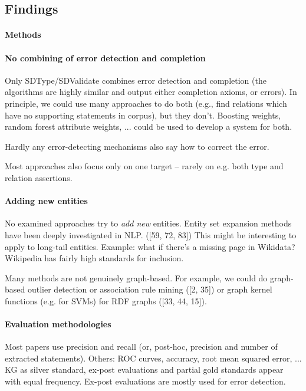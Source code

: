 \subsection{Findings}

\paragraph{Methods}

\paragraph{No combining of error detection and completion}
Only SDType/SDValidate combines error detection and completion (the algorithms
are highly similar and output either completion axioms, or errors).
In principle, we could use many approaches to do both (e.g., find relations
which have no supporting statements in corpus), but they don't.
Boosting weights, random forest attribute weights, ... could be used to develop
a system for both.

Hardly any error-detecting mechanisms also say how to correct the error.

Most approaches also focus only on one target -- rarely on e.g. both type and
relation assertions.

\paragraph{Adding new entities}
No examined approaches try to \textit{add new} entities. Entity set expansion
methods have been deeply investigated in NLP. ([59, 72, 83])
This might be interesting to apply to long-tail entities.
Example: what if there's a missing page in Wikidata? Wikipedia has fairly high
standards for inclusion.

Many methods are not genuinely graph-based. For example, we could do graph-based
outlier detection or association rule mining ([2, 35]) or graph kernel functions
(e.g. for SVMs) for RDF graphs ([33, 44, 15]).

\paragraph{Evaluation methodologies}

Most papers use precision and recall (or, post-hoc, precision and number of
extracted statements). Others: ROC curves, accuracy, root mean squared error,
...
KG as silver standard, ex-post evaluations and partial gold standards appear
with equal frequency. Ex-post evaluations are mostly used for error detection.

